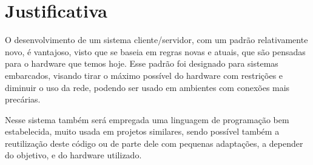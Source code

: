 \section{Justificativa}

O desenvolvimento de um sistema cliente/servidor, com um padrão relativamente novo, é vantajoso, visto que se baseia em regras novas e atuais, que são pensadas para o hardware que temos hoje. Esse padrão foi designado para sistemas embarcados, visando tirar o máximo possível do hardware com restrições e diminuir o uso da rede, podendo ser usado em ambientes com conexões mais precárias.

Nesse sistema também será empregada uma linguagem de programação bem estabelecida, muito usada em projetos similares, sendo possível também a reutilização deste código ou de parte dele com pequenas adaptações, a depender do objetivo, e do hardware utilizado.


